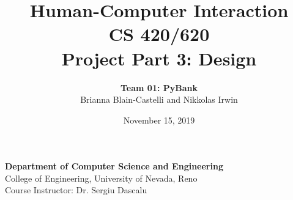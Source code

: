 \documentclass{article}
\title{\textbf{Human-Computer Interaction} \\ \Large{CS 420/620} \\ \large{Project Part 3: Design} \vspace{+16ex}}
\author{\textbf{\Large Team 01: PyBank} \\ \large{Brianna Blain-Castelli and Nikkolas Irwin}}
\date{\vspace{-2ex} \large{November 15, 2019}}
\begin{document}
\maketitle

\begin{center}
    \vspace{+16ex}
    {\textbf{\Large{Department of Computer Science and Engineering}} \\
    \large{College of Engineering, University of Nevada, Reno} \\
    \large{Course Instructor: Dr. Sergiu Dascalu}}
\end{center}

\newpage

\tableofcontents

\newpage
\setlength{\cftfigindent}{0pt}  %
\listoffigures

\newpage

\doublespacing
{}

\newpage

\newpage

\newpage

\newpage

\newpage

\newpage

\end{document}
